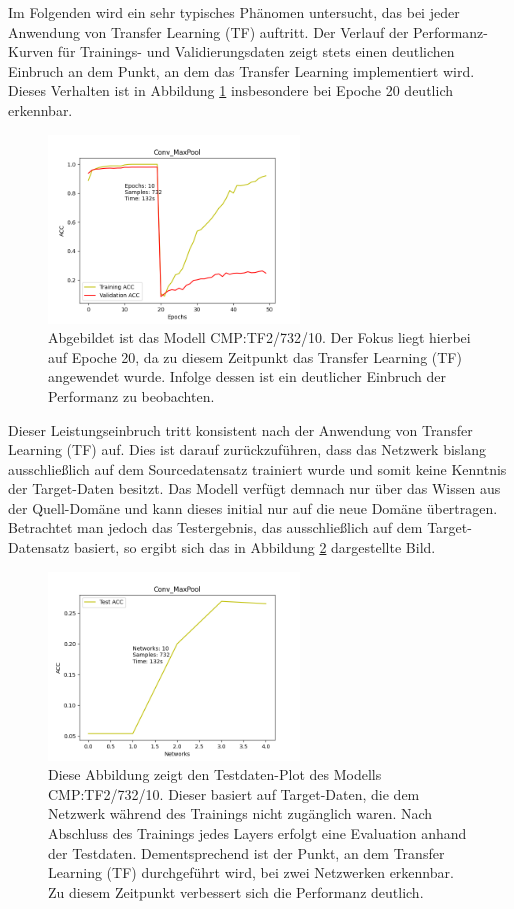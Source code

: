 Im Folgenden wird ein sehr typisches Phänomen untersucht, das bei jeder Anwendung von Transfer Learning (TF) auftritt. Der Verlauf der 
Performanz-Kurven für Trainings- und Validierungsdaten zeigt stets einen deutlichen Einbruch an dem Punkt, an dem das Transfer Learning 
implementiert wird. Dieses Verhalten ist in Abbildung \ref{fig:convmaxpooltrain} insbesondere bei Epoche 20 deutlich erkennbar.

\begin{figure}[htpb]
    \centering
    \includegraphics[height=5cm]{../../Plots/ba_plots/convmaxpool/convmaxpooltrain.png}
    \caption{\label{fig:convmaxpooltrain} 
    \small{Abgebildet ist das Modell CMP:TF2/732/10. Der Fokus liegt hierbei auf Epoche 20, da zu diesem Zeitpunkt das Transfer Learning (TF) 
    angewendet wurde. Infolge dessen ist ein deutlicher Einbruch der Performanz zu beobachten.}}
\end{figure}

Dieser Leistungseinbruch tritt konsistent nach der Anwendung von Transfer Learning (TF) auf. Dies ist darauf zurückzuführen, dass das Netzwerk 
bislang ausschließlich auf dem Sourcedatensatz trainiert wurde und somit keine Kenntnis der Target-Daten besitzt. Das Modell verfügt demnach 
nur über das Wissen aus der Quell-Domäne und kann dieses initial nur auf die neue Domäne übertragen. Betrachtet man jedoch das Testergebnis, 
das ausschließlich auf dem Target-Datensatz basiert, so ergibt sich das in Abbildung \ref{fig:convmaxpooltest} dargestellte Bild.

\begin{figure}[htpb]
    \centering
    \includegraphics[height=5cm]{../../Plots/ba_plots/convmaxpool/convmaxpooltest.png}
    \caption{\label{fig:convmaxpooltest} 
    \small{Diese Abbildung zeigt den Testdaten-Plot des Modells CMP:TF2/732/10. Dieser basiert auf Target-Daten, die dem Netzwerk während des 
    Trainings nicht zugänglich waren. Nach Abschluss des Trainings jedes Layers erfolgt eine Evaluation anhand der Testdaten. Dementsprechend 
    ist der Punkt, an dem Transfer Learning (TF) durchgeführt wird, bei zwei Netzwerken erkennbar. Zu diesem Zeitpunkt verbessert sich die 
    Performanz deutlich.}}
\end{figure}

